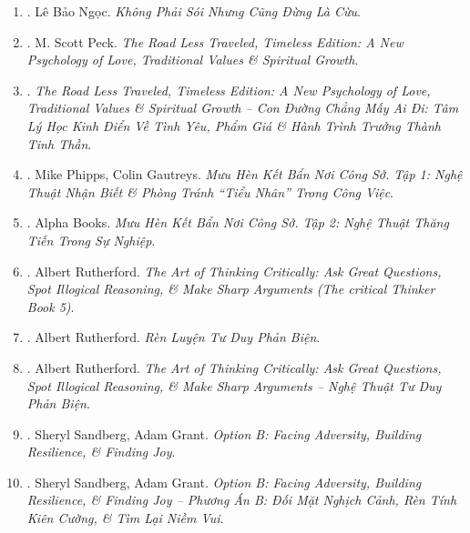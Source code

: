 \documentclass{article}
\begin{document}
\begin{enumerate}
	\item \cite{Ngoc_wolf_sheep}. {\sc Lê Bảo Ngọc}. {\it Không Phải Sói Nhưng Cũng Đừng Là Cừu}.\hfill{\sf[done]}
	
	\item \cite{Peck_road}. {\sc M. Scott Peck}. {\it The Road Less Traveled, Timeless Edition: A New Psychology of Love, Traditional Values \& Spiritual Growth}.
	
	\item \cite{Peck_road_VN}. {\it The Road Less Traveled, Timeless Edition: A New Psychology of Love, Traditional Values \& Spiritual Growth -- Con Đường Chẳng Mấy Ai Đi: Tâm Lý Học Kinh Điển Về Tình Yêu, Phẩm Giá \& Hành Trình Trưởng Thành Tinh Thần}.\hfill{\sf[done]}
	
	\item \cite{Phipps_Gautreys_muu_hen_ke_ban_tap_1}. Mike Phipps, Colin Gautreys. {\it Mưu Hèn Kết Bẩn Nơi Công Sở. Tập 1: Nghệ Thuật Nhận Biết \& Phòng Tránh ``Tiểu Nhân'' Trong Công Việc}.\hfill{\sf[done]}
	
	\item \cite{muu_hen_ke_ban_tap_2}. Alpha Books. {\it Mưu Hèn Kết Bẩn Nơi Công Sở. Tập 2: Nghệ Thuật Thăng Tiến Trong Sự Nghiệp}.\hfill{\sf[done]}
	
	\item \cite{Rutherford2020}. Albert Rutherford. {\it The Art of Thinking Critically: Ask Great Questions, Spot Illogical Reasoning, \& Make Sharp Arguments (The critical Thinker Book 5)}.\hfill{\sf[reading]}
	
	\item \cite{Rutherford2022}. Albert Rutherford. {\it Rèn Luyện Tư Duy Phản Biện}.\hfill{\sf[done]}
	
	\item \cite{Rutherford2023}. Albert Rutherford. {\it The Art of Thinking Critically: Ask Great Questions, Spot Illogical Reasoning, \& Make Sharp Arguments -- Nghệ Thuật Tư Duy Phản Biện}.\hfill{\sf[done]}
	
	\item \cite{Sandberg_Grant2017}. Sheryl Sandberg, Adam Grant. {\it Option B: Facing Adversity, Building Resilience, \& Finding Joy}.\hfill{\sf[reading]}
	
	\item \cite{Sandberg_Grant2019}. Sheryl Sandberg, Adam Grant. {\it Option B: Facing Adversity, Building Resilience, \& Finding Joy -- Phương Án B: Đối Mặt Nghịch Cảnh, Rèn Tính Kiên Cường, \& Tìm Lại Niềm Vui}.\hfill{\sf[done]}
	

\end{enumerate}
\end{document}
